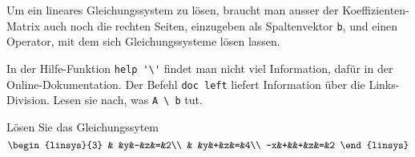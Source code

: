 Um ein lineares Gleichungssystem zu lösen, braucht man ausser
der Koeffizienten-Matrix auch noch die rechten Seiten, einzugeben
als Spaltenvektor {\tt b}, und einen Operator, mit dem sich
Gleichungssysteme lösen lassen.
\begin{teilaufgaben}
\item In der Hilfe-Funktion \verb+help '\'+ findet man nicht
viel Information, dafür in der Online-Dokumentation. Der
Befehl \verb+doc left+ liefert Information über die Links-Division.
Lesen sie nach, was \verb+A \ b+ tut.
\item Lösen Sie das Gleichungssytem
\[
\begin{linsys}{3}
 & &y&-&z&=&2\\
 & &y&+&z&=&4\\
-x&+&&+&z&=&2
\end{linsys}
\]
\end{teilaufgaben}

\begin{loesung}
\begin{teilaufgaben}
\item
\item
{}
\end{teilaufgaben}
\end{loesung}

